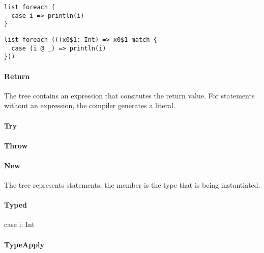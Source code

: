 \begin{multicols}{2}
\begin{lstlisting}
list foreach {
  case i => println(i)
}
\end{lstlisting}
\begin{lstlisting}
list foreach (((x0$1: Int) => x0$1 match {
  case (i @ _) => println(i)
}))
\end{lstlisting}
\end{multicols}

\paragraph{Return} 

\noindent The  tree contains an expression that consitutes the return value. For  statements without an expression, the compiler generates a \src{()} literal.

\paragraph{Try} 

\paragraph{Throw} 

\paragraph{New} 

\noindent The  tree represents  statements, the  member is the type that is being instantiated.

\paragraph{Typed} 

case i: Int

\paragraph{TypeApply} 

